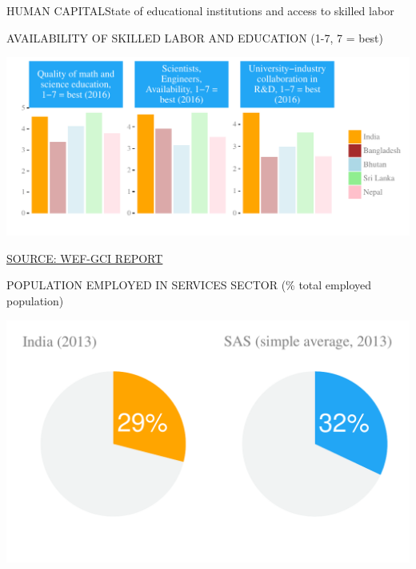 \documentclass{article}\usepackage[]{graphicx}\usepackage[]{color}
\makeatletter
\def\maxwidth{ %
  \ifdim\Gin@nat@width>\linewidth
    \linewidth
  \else
    \Gin@nat@width
  \fi
}
\makeatother
\begin{document}
\begin{minipage}[b]{0.95\textwidth}
   \vspace{5ex}
   \begin{flushleft}  
     \hspace{4ex}\Large{\textcolor[HTML]{22A6F5}{HUMAN CAPITAL}}\hspace{2ex}\small{\textcolor[HTML]{818181}{State of educational institutions and access to skilled labor}}
   \end{flushleft} 
  \begin{minipage}[c]{0.55\textwidth} %
    \hspace{4ex}\small{\textcolor[HTML]{818181}{AVAILABILITY OF SKILLED LABOR AND EDUCATION
(1-7, 7 = best)}}
    


\hfill{}\includegraphics[width=\maxwidth]{figure/bar_facewrap_chart_Human-1} 



    \hspace{4ex}\scriptsize{\href{NA}{\textcolor[HTML]{22A6F5}{SOURCE: WEF-GCI REPORT}}}
  \end{minipage}
  \begin{minipage}[c]{0.43\textwidth} %
    \small{\textcolor[HTML]{818181}{POPULATION EMPLOYED IN SERVICES SECTOR (\% total employed population)}}
    \vspace{-2ex}


{\centering \includegraphics[width=\maxwidth]{figure/pie_chart_double_Human-1} 

}
\end{minipage}
\end{minipage}
\end{document}
